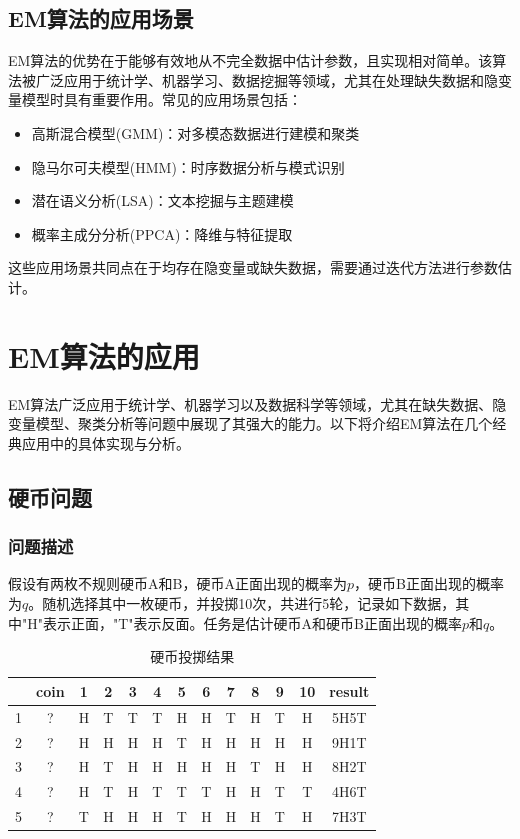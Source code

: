 \documentclass[a4paper,12pt]{ctexart} %
\begin{document}
\subsection{EM算法的应用场景}

EM算法的优势在于能够有效地从不完全数据中估计参数，且实现相对简单。该算法被广泛应用于统计学、机器学习、数据挖掘等领域，尤其在处理缺失数据和隐变量模型时具有重要作用。常见的应用场景包括：
\begin{itemize}
    \item 高斯混合模型(GMM)：对多模态数据进行建模和聚类
    \item 隐马尔可夫模型(HMM)：时序数据分析与模式识别
    \item 潜在语义分析(LSA)：文本挖掘与主题建模
    \item 概率主成分分析(PPCA)：降维与特征提取
\end{itemize}

这些应用场景共同点在于均存在隐变量或缺失数据，需要通过迭代方法进行参数估计。

\section{EM算法的应用}

EM算法广泛应用于统计学、机器学习以及数据科学等领域，尤其在缺失数据、隐变量模型、聚类分析等问题中展现了其强大的能力。以下将介绍EM算法在几个经典应用中的具体实现与分析。

\subsection{硬币问题}

\subsubsection{问题描述}
假设有两枚不规则硬币A和B，硬币A正面出现的概率为$p$，硬币B正面出现的概率为$q$。随机选择其中一枚硬币，并投掷10次，共进行5轮，记录如下数据，其中"H"表示正面，"T"表示反面。任务是估计硬币A和硬币B正面出现的概率$p$和$q$。

\begin{table}[H]
    \centering
    \caption{硬币投掷结果}
    \begin{tabular}{ccccccccccccc}
    \toprule
     & coin & 1 & 2 & 3 & 4 & 5 & 6 & 7 & 8 & 9 & 10 & result \\
    \midrule
    1 & ? & H & T & T & T & H & H & T & H & T & H & 5H5T \\
    2 & ? & H & H & H & H & T & H & H & H & H & H & 9H1T \\
    3 & ? & H & T & H & H & H & H & H & T & H & H & 8H2T \\
    4 & ? & H & T & H & T & T & T & H & H & T & T & 4H6T \\
    5 & ? & T & H & H & H & T & H & H & H & T & H & 7H3T \\
    \bottomrule
    \end{tabular}
\end{table}
\end{document}
